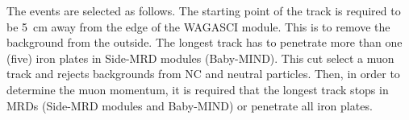 The events are selected as follows.
The starting point of the track is required to be 5~cm away from the edge of the WAGASCI module. This is to remove the background from the outside.
The longest track has to penetrate more than one (five) iron plates in Side-MRD modules (Baby-MIND).
This cut select a muon track and rejects backgrounds from NC and neutral particles.
Then, in order to determine the muon momentum, it is required that the longest track stops in MRDs (Side-MRD modules and Baby-MIND) or penetrate all iron plates.



